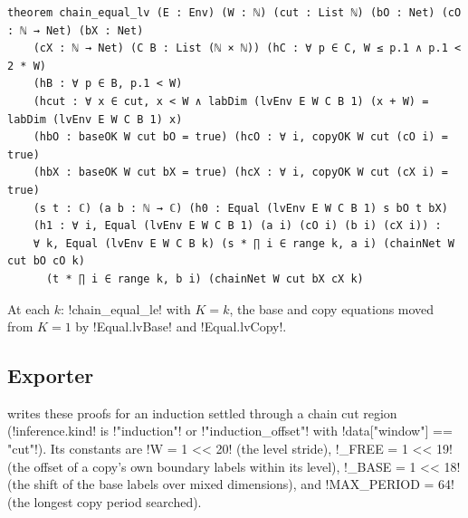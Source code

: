 {\begin{theorem}\label{thm:boxes-chain-equal-lv}
\begin{lstlisting}[style=leanbox]
theorem chain_equal_lv (E : Env) (W : ℕ) (cut : List ℕ) (bO : Net) (cO : ℕ → Net) (bX : Net)
    (cX : ℕ → Net) (C B : List (ℕ × ℕ)) (hC : ∀ p ∈ C, W ≤ p.1 ∧ p.1 < 2 * W)
    (hB : ∀ p ∈ B, p.1 < W)
    (hcut : ∀ x ∈ cut, x < W ∧ labDim (lvEnv E W C B 1) (x + W) = labDim (lvEnv E W C B 1) x)
    (hbO : baseOK W cut bO = true) (hcO : ∀ i, copyOK W cut (cO i) = true)
    (hbX : baseOK W cut bX = true) (hcX : ∀ i, copyOK W cut (cX i) = true)
    (s t : ℂ) (a b : ℕ → ℂ) (h0 : Equal (lvEnv E W C B 1) s bO t bX)
    (h1 : ∀ i, Equal (lvEnv E W C B 1) (a i) (cO i) (b i) (cX i)) :
    ∀ k, Equal (lvEnv E W C B k) (s * ∏ i ∈ range k, a i) (chainNet W cut bO cO k)
      (t * ∏ i ∈ range k, b i) (chainNet W cut bX cX k)
\end{lstlisting}
\end{theorem}
\noindent At each $k$: \lbx!chain_equal_le! with $K=k$, the base and copy equations moved from $K=1$ by \lbx!Equal.lvBase! and \lbx!Equal.lvCopy!.

\subsection{Exporter}\label{sec:boxes-chain-export}
 writes these proofs for an induction settled through a chain cut region (\py!inference.kind! is \py!"induction"! or \py!"induction_offset"! with \py!data["window"] == "cut"!). Its constants are \py!W = 1 << 20! (the level stride), \py!_FREE = 1 << 19! (the offset of a copy's own boundary labels within its level), \py!_BASE = 1 << 18! (the shift of the base labels over mixed dimensions), and \py!MAX_PERIOD = 64! (the longest copy period searched).

}
